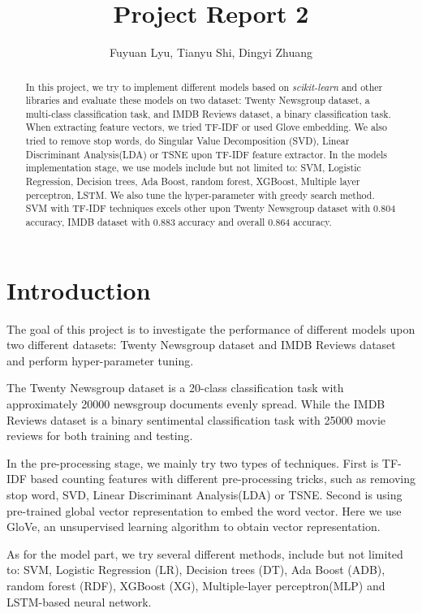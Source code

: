 \documentclass[11pt]{scrartcl}
\title{Project Report 2}
\author{Fuyuan Lyu, Tianyu Shi, Dingyi Zhuang}
\begin{document}
\maketitle

\begin{abstract}
In this project, we try to implement different models based on \textit{scikit-learn} and other libraries and evaluate these models on two dataset: Twenty Newsgroup dataset, a multi-class classification task, and IMDB Reviews dataset, a binary classification task. When extracting feature vectors, we tried TF-IDF or used Glove embedding. We also tried to remove stop words, do Singular Value Decomposition (SVD), Linear Discriminant Analysis(LDA) or TSNE upon TF-IDF feature extractor. In the models implementation stage, we use models include but not limited to: SVM, Logistic Regression, Decision trees, Ada Boost, random forest, XGBoost, Multiple layer perceptron, LSTM. We also tune the hyper-parameter with greedy search method. SVM with TF-IDF techniques excels other upon Twenty Newsgroup dataset with 0.804 accuracy, IMDB dataset with 0.883 accuracy and overall 0.864 accuracy.
\end{abstract}

\section{Introduction}
The goal of this project is to investigate the performance of different models upon two different datasets: Twenty Newsgroup dataset and IMDB Reviews dataset and perform hyper-parameter tuning.

The Twenty Newsgroup dataset is a 20-class classification task with approximately 20000 newsgroup documents evenly spread\cite{Lang95}. While the IMDB Reviews dataset is a binary sentimental classification task with 25000 movie reviews for both training and testing\cite{maas-EtAl:2011:ACL-HLT2011}.

In the pre-processing stage, we mainly try two types of techniques. First is TF-IDF based counting features with different pre-processing tricks, such as removing stop word, SVD, Linear Discriminant Analysis(LDA) or TSNE. Second is using pre-trained global vector representation to embed the word vector. Here we use GloVe, an unsupervised learning algorithm to obtain vector representation\cite{pennington2014glove}.

As for the model part, we try several different methods, include but not limited to: SVM, Logistic Regression (LR), Decision trees (DT), Ada Boost (ADB), random forest (RDF), XGBoost (XG), Multiple-layer perceptron(MLP) and LSTM-based neural network.
\end{document}
